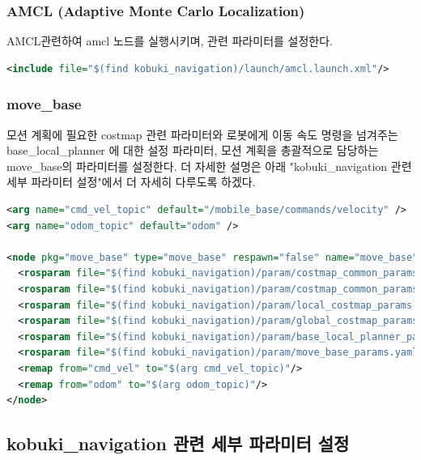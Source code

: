 \subsubsection{AMCL (Adaptive Monte Carlo Localization)}
AMCL관련하여 amcl 노드를 실행시키며, 관련 파라미터를 설정한다.

\vspace{\baselineskip}
\begin{lstlisting}[language=XML]
<include file="$(find kobuki_navigation)/launch/amcl.launch.xml"/>
\end{lstlisting}

\subsubsection{move\_base}
모션 계획에 필요한 costmap 관련 파라미터와 로봇에게 이동 속도 명령을 넘겨주는 base\_local\_planner 에 대한 설정 파라미터, 모션 계획을 총괄적으로 담당하는 move\_base의 파라미터를 설정한다. 더 자세한 설명은 아래 "kobuki\_navigation 관련 세부 파라미터 설정"에서 더 자세히 다루도록 하겠다.

\vspace{\baselineskip}
\begin{lstlisting}[language=XML]
<arg name="cmd_vel_topic" default="/mobile_base/commands/velocity" />
<arg name="odom_topic" default="odom" />

<node pkg="move_base" type="move_base" respawn="false" name="move_base" output="screen">
  <rosparam file="$(find kobuki_navigation)/param/costmap_common_params.yaml" command="load" ns="global_costmap" />
  <rosparam file="$(find kobuki_navigation)/param/costmap_common_params.yaml" command="load" ns="local_costmap" />
  <rosparam file="$(find kobuki_navigation)/param/local_costmap_params.yaml" command="load" />
  <rosparam file="$(find kobuki_navigation)/param/global_costmap_params.yaml" command="load" />
  <rosparam file="$(find kobuki_navigation)/param/base_local_planner_params.yaml" command="load" />
  <rosparam file="$(find kobuki_navigation)/param/move_base_params.yaml" command="load" />
  <remap from="cmd_vel" to="$(arg cmd_vel_topic)"/>
  <remap from="odom" to="$(arg odom_topic)"/>
</node>
\end{lstlisting}

\subsection{kobuki\_navigation 관련 세부 파라미터 설정}

